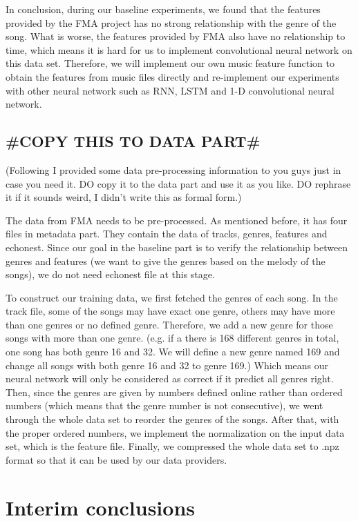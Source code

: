 \documentclass{article}
\begin{document}
In conclusion, during our baseline experiments, we found that the features provided by the FMA project has no strong relationship with the genre of the song. What is worse, the features provided by FMA also have no relationship to time, which means it is hard for us to implement convolutional neural network on this data set. Therefore, we will implement our own music feature function to obtain the features from music files directly and re-implement our experiments with other neural network such as RNN, LSTM and 1-D convolutional neural network.

\subsection{\#COPY THIS TO DATA PART\#}
(Following I provided some data pre-processing information to you guys just in case you need it. DO copy it to the data part and use it as you like. DO rephrase it if it sounds weird, I didn't write this as formal form.)

The data from FMA needs to be pre-processed. As mentioned before, it has four files in metadata part. They contain the data of tracks, genres, features and echonest. Since our goal in the baseline part is to verify the relationship between genres and features (we want to give the genres based on the melody of the songs), we do not need echonest file at this stage.

To construct our training data, we first fetched the genres of each song. In the track file, some of the songs may have exact one genre, others may have more than one genres or no defined genre. Therefore, we add a new genre for those songs with more than one genre. (e.g. if a there is 168 different genres in total, one song has both genre 16 and 32. We will define a new genre named 169 and change all songs with both genre 16 and 32 to genre 169.) Which means our neural network will only be considered as correct if it predict all genres right. Then, since the genres are given by numbers defined online rather than ordered numbers (which means that the genre number is not consecutive), we went through the whole data set to reorder the genres of the songs. After that, with the proper ordered numbers, we implement the normalization on the input data set, which is the feature file. Finally, we compressed the whole data set to .npz format so that it can be used by our data providers.

\section{Interim conclusions}
\end{document}
